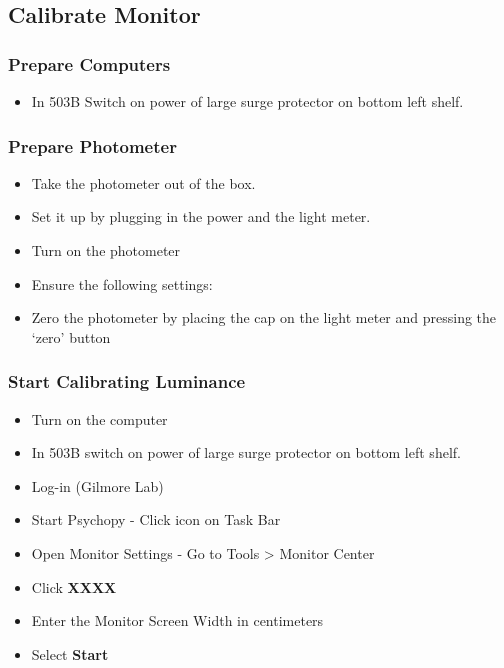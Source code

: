 \documentclass[]{article}
\providecommand{\tightlist}{%
  \setlength{\itemsep}{0pt}\setlength{\parskip}{0pt}}
\begin{document}
\subsection{Calibrate Monitor}\label{calibrate-monitor}

\subsubsection{Prepare Computers}\label{prepare-computers}

\begin{itemize}
\tightlist
\item
  In 503B Switch on power of large surge protector on bottom left shelf.
\end{itemize}

\subsubsection{Prepare Photometer}\label{prepare-photometer}

\begin{itemize}
\tightlist
\item
  Take the photometer out of the box.
\item
  Set it up by plugging in the power and the light meter.
\item
  Turn on the photometer
\item
  Ensure the following settings:
\item
  Zero the photometer by placing the cap on the light meter and pressing
  the `zero' button
\end{itemize}

\subsubsection{Start Calibrating
Luminance}\label{start-calibrating-luminance}

\begin{itemize}
\item
  Turn on the computer
\item
  In 503B switch on power of large surge protector on bottom left shelf.
\item
  Log-in (Gilmore Lab)
\item
  Start Psychopy - Click icon on Task Bar
\item
  Open Monitor Settings - Go to Tools \textgreater{} Monitor Center
\item
  Click \textbf{XXXX}
\item
  Enter the Monitor Screen Width in centimeters
\item
  Select \textbf{Start}\\
\end{itemize}
\end{document}
